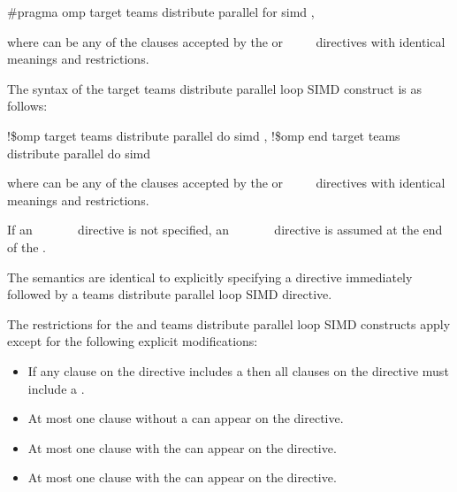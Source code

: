 \begin{boxedcode}[fontsize=\small]
\#pragma omp target teams distribute parallel for simd \plc{[clause[ [},\plc{] clause] ... ]}
\end{boxedcode}

where  can be any of the clauses accepted by the  or 
~~~~
directives with identical meanings and restrictions.
\ccppspecificend

\fortranspecificstart
The syntax of the target teams distribute parallel loop SIMD construct is as follows:

\begin{boxedcode}
!\$omp target teams distribute parallel do simd \plc{[clause[ [},\plc{] clause] ... ]}
\plc{[}!\$omp end target teams distribute parallel do simd\plc{]}
\end{boxedcode}

where  can be any of the clauses accepted by the 
 or ~~~~
directives with identical meanings and restrictions.

If an ~~~~~~ 
directive is not specified, an 
~~~~~~ 
directive is assumed at the end of the .
\fortranspecificend

\descr
The semantics are identical to explicitly specifying a  
directive immediately followed by a teams distribute parallel loop 
SIMD directive.

\restrictions
The restrictions for the  and teams distribute parallel 
loop SIMD constructs apply except for the following explicit modifications:

\begin{itemize}
\item If any  clause on the directive includes a
       then all  clauses 
      on the directive must include a .

\item At most one  clause without a 
       can appear on the directive.

\item At most one  clause with the 
       can appear on the directive.

\item At most one  clause with the 
       can appear on the directive.
\end{itemize}

